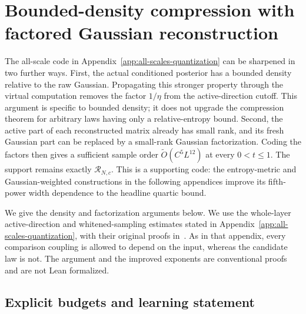 \section{Bounded-density compression with factored Gaussian reconstruction}
\label{app:factor-code}

The all-scale code in Appendix~\ref{app:all-scales-quantization} can be
sharpened in two further ways. First, the actual conditioned posterior has
a bounded density relative to the raw Gaussian. Propagating this stronger
property through the virtual computation removes the factor $1/\eta$
from the active-direction cutoff. This argument is specific to bounded
density; it does not upgrade the compression theorem for arbitrary laws
having only a relative-entropy bound. Second, the active part of each
reconstructed matrix already has small rank, and its fresh Gaussian part
can be replaced by a small-rank Gaussian factorization. Coding the factors
then gives a sufficient sample order $\widetilde O(C^5L^{12})$ at every
$0<t\le1$. The support remains exactly $\mathcal R_{N,c}$. This is a supporting
code: the entropy-metric and Gaussian-weighted constructions in the
following appendices improve its fifth-power width dependence to the
headline quartic bound.

We give the density and factorization arguments below. We use the
whole-layer active-direction and whitened-sampling estimates stated in
Appendix~\ref{app:all-scales-quantization}, with their original proofs
in~\cite{all-scales}. As in that appendix, every comparison coupling is
allowed to depend on the input, whereas the candidate law is not. The
argument and the improved exponents are conventional proofs and are not
Lean formalized.

\subsection{Explicit budgets and learning statement}

